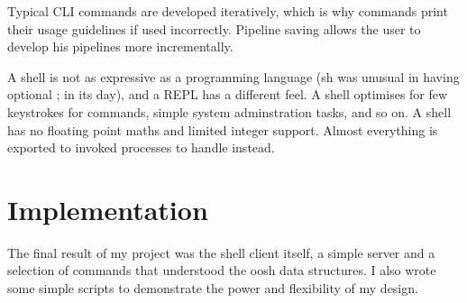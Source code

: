 \documentclass[12pt,twoside,notitlepage]{report}
\begin{document}

Typical CLI commands are developed iteratively, which is why commands print
their usage guidelines if used incorrectly. Pipeline saving allows the user to
develop his pipelines more incrementally.

A shell is not as expressive as a programming language (sh was unusual in having
optional ; in its day), and a REPL has a different feel. A shell optimises for
few keystrokes for commands, simple system adminstration tasks, and so on. A
shell has no floating point maths and limited integer support. Almost everything
is exported to invoked processes to handle instead.





\cleardoublepage

\chapter{Implementation}
The final result of my project was the shell client itself, a simple server and
a selection of commands that understood the oosh data structures. I also wrote
some simple scripts to demonstrate the power and flexibility of my design.
\end{document}
